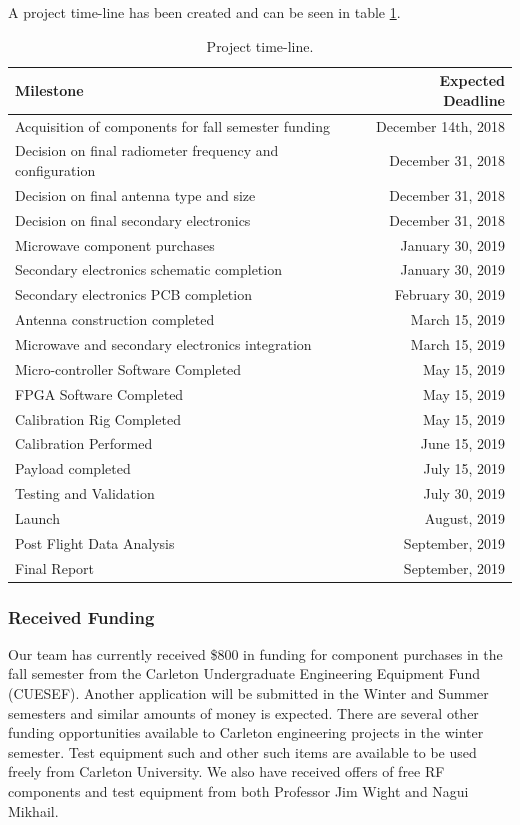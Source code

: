 \documentclass[12pt]{article}
\begin{document}
A project time-line has been created and can be seen in table \ref{tab:timeline}.

\begin{table}[!h]
	\centering
	\vspace{0.5cm}
	\renewcommand{\arraystretch}{1.3}
	\caption{Project time-line.}
	\label{tab:timeline}
	\begin{tabularx}{\textwidth}{lr}
		\toprule
		Milestone & Expected Deadline\\	
		\midrule
		Acquisition of components for fall semester funding & December 14th, 2018\\
		Decision on final radiometer frequency and configuration & December 31, 2018\\
		Decision on final antenna type and size & December 31, 2018\\
		Decision on final secondary electronics & December 31, 2018\\
		Microwave component purchases  & January 30, 2019\\
		Secondary electronics schematic completion & January 30, 2019\\
		Secondary electronics PCB completion & February 30, 2019\\
		Antenna construction completed  & March 15, 2019\\
		Microwave and secondary electronics integration & March 15, 2019 \\
		Micro-controller Software Completed & May 15, 2019\\
		FPGA Software Completed & May 15, 2019\\
		Calibration Rig Completed & May 15, 2019\\
		Calibration Performed & June 15, 2019\\
		Payload completed & July 15, 2019\\
		Testing and Validation & July 30, 2019\\
		Launch & August, 2019\\
		Post Flight Data Analysis & September, 2019\\
		Final Report & September, 2019
		\end{tabularx}	
\end{table}


\subsubsection{Received Funding}

Our team has currently received \$800 in funding for component purchases in the fall semester from the Carleton Undergraduate Engineering Equipment Fund (CUESEF). Another application will be submitted in the Winter and Summer semesters and similar amounts of money is expected. There are several other funding opportunities available to Carleton engineering projects in the winter semester. Test equipment such and other such items are available to be used freely from Carleton University. We also have received offers of free RF components and test equipment from both Professor Jim Wight and Nagui Mikhail.
\end{document}
